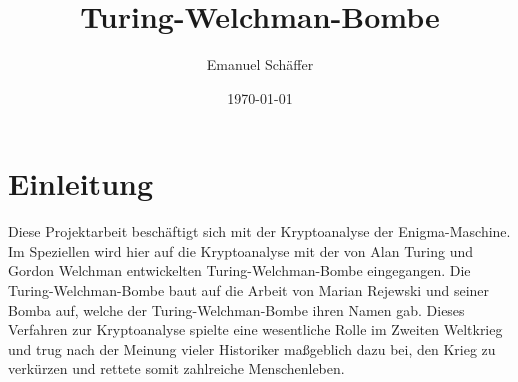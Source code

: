 \documentclass[ngerman, a4paper, footsepline, headsepline]{scrreport}
\begin{document}
	\subject{Kryptoanalyse der Enigma-Maschine durch eine Software-Nachbildung der Turing-Welchman-Bombe}
	\title{Turing-Welchman-Bombe}
	\author{Emanuel Schäffer}
	\date{\today}
	\publishers{RWU--University of Applied Sciences \\ Prof. Dipl.-Math. Ekkehard Löhmann}
	\maketitle
	
	\tableofcontents
	
	\chapter{Einleitung}\label{ch:einleitung}
	Diese Projektarbeit beschäftigt sich mit der Kryptoanalyse der Enigma-Maschine.
	Im Speziellen wird hier auf die Kryptoanalyse mit der von Alan Turing und Gordon Welchman entwickelten \glqq Turing-Welchman-Bombe\grqq{} eingegangen.
	Die Turing-Welchman-Bombe baut auf die Arbeit von Marian Rejewski und seiner \glqq Bomba\grqq{} auf, welche der Turing-Welchman-Bombe ihren Namen gab.
	Dieses Verfahren zur Kryptoanalyse spielte eine wesentliche Rolle im Zweiten Weltkrieg und trug nach der Meinung vieler Historiker maßgeblich dazu bei, den Krieg zu verkürzen und rettete somit zahlreiche Menschenleben.
	
	
	
	
	
	
	
	
	
	
%	
	
	\newpage
\end{document}
